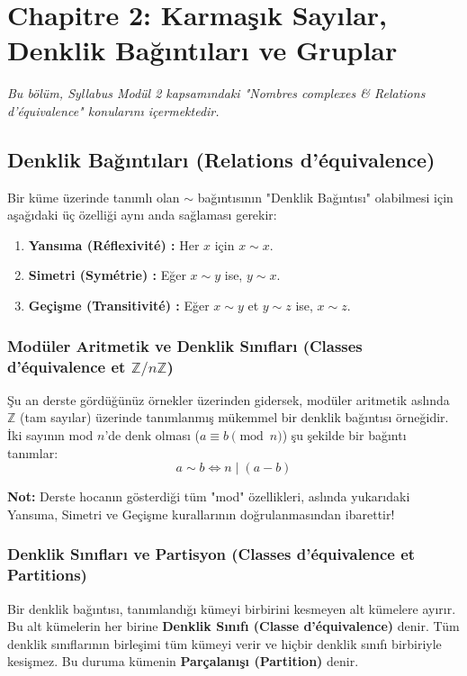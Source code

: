 \documentclass[12pt,a4paper]{report}
\begin{document}
\chapter{Chapitre 2: Karmaşık Sayılar, Denklik Bağıntıları ve Gruplar}
\textit{Bu bölüm, Syllabus Modül 2 kapsamındaki "Nombres complexes \& Relations d'équivalence" konularını içermektedir.}

\section{Denklik Bağıntıları (Relations d'équivalence)}
Bir küme üzerinde tanımlı olan $\sim$ bağıntısının "Denklik Bağıntısı" olabilmesi için aşağıdaki üç özelliği aynı anda sağlaması gerekir:

\begin{tcolorbox}[colback=yellow!10!white,colframe=orange!80!black,title=Özellikler]
\begin{enumerate}
    \item \textbf{Yansıma (Réflexivité) :} Her $x$ için $x \sim x$.
    \item \textbf{Simetri (Symétrie) :} Eğer $x \sim y$ ise, $y \sim x$.
    \item \textbf{Geçişme (Transitivité) :} Eğer $x \sim y$ et $y \sim z$ ise, $x \sim z$.
\end{enumerate}
\end{tcolorbox}

\subsection*{Modüler Aritmetik ve Denklik Sınıfları (Classes d'équivalence et $\mathbb{Z}/n\mathbb{Z}$)}
Şu an derste gördüğünüz örnekler üzerinden gidersek, modüler aritmetik aslında $\mathbb{Z}$ (tam sayılar) üzerinde tanımlanmış mükemmel bir denklik bağıntısı örneğidir. 
İki sayının mod $n$'de denk olması ($a \equiv b \pmod n$) şu şekilde bir bağıntı tanımlar:
\[ a \sim b \iff n \mid (a-b) \]

\textbf{Not:} Derste hocanın gösterdiği tüm "mod" özellikleri, aslında yukarıdaki Yansıma, Simetri ve Geçişme kurallarının doğrulanmasından ibarettir!

\subsection*{Denklik Sınıfları ve Partisyon (Classes d'équivalence et Partitions)}
Bir denklik bağıntısı, tanımlandığı kümeyi birbirini kesmeyen alt kümelere ayırır. Bu alt kümelerin her birine \textbf{Denklik Sınıfı (Classe d'équivalence)} denir. Tüm denklik sınıflarının birleşimi tüm kümeyi verir ve hiçbir denklik sınıfı birbiriyle kesişmez. Bu duruma kümenin \textbf{Parçalanışı (Partition)} denir.
\end{document}

